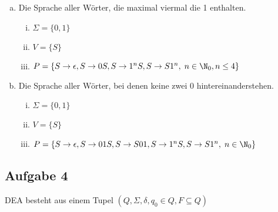   \begin{enumerate}[a)]
    \item Die Sprache aller Wörter, die maximal viermal die 1 enthalten.

    \begin{enumerate}[i)]
      \item $\Sigma = \{ 0,1 \}$
      \item $V = \{S \} $
      \item $P = \{ S \to \epsilon, S \to 0S, S \to 1^n S, S \to S 1^n, \; n \in \N_{0}, n \leq 4 \}$
    \end{enumerate}

    \item Die Sprache aller Wörter, bei denen keine zwei 0 hintereinanderstehen.

    \begin{enumerate}[i)]
      \item $\Sigma = \{ 0,1 \}$
      \item $V = \{S \} $
      \item $P = \{ S \to \epsilon,
      S \to 01S, S \to S 01,
      S \to 1^{n} S,
      S \to S 1^{n},
      \; n \in \N_{0} \}$
    \end{enumerate}


  \end{enumerate}

  \subsection*{Aufgabe 4}

  DEA besteht aus einem Tupel $  (Q, \Sigma, \delta, q_0 \in Q, F \subseteq Q) $

